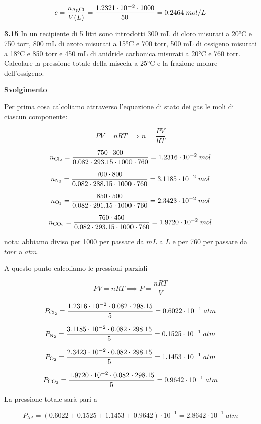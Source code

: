 $$c=\frac{n_{\rm AgCl}}{V(L)}
=\frac{1.2321 \cdot 10^{-2} \cdot 1000}{50}
=0.2464\;mol/L$$

\vspace{0.2cm}\textbf{3.15} In un recipiente di 5 litri sono introdotti 300 mL di cloro misurati a 20°C e 750 torr, 800 mL di azoto misurati a 15°C e 700 torr, 500 mL di ossigeno misurati a 18°C e 850 torr e 450 mL di anidride carbonica misurati a 20°C e 760 torr. Calcolare la pressione totale della miscela a 25°C e la frazione molare dell'ossigeno.

\vspace{0.2cm}\large\textbf{Svolgimento}\normalsize

\vspace{0.2cm}Per prima cosa calcoliamo attraverso l'equazione di stato dei gas le moli di ciascun componente:

$$PV=nRT \implies n=\frac{PV}{RT}$$

$$n_{\rm Cl_2}=\frac{750 \cdot 300}{0.082 \cdot 293.15 \cdot 1000 \cdot 760}=1.2316 \cdot 10^{-2}\;mol$$

$$n_{\rm N_2}=\frac{700 \cdot 800}{0.082 \cdot 288.15 \cdot 1000 \cdot 760}=3.1185 \cdot 10^{-2}\;mol$$

$$n_{\rm O_2}=\frac{850 \cdot 500}{0.082 \cdot 291.15 \cdot 1000 \cdot 760}=2.3423 \cdot 10^{-2}\;mol$$

$$n_{\rm CO_2}=\frac{760 \cdot 450}{0.082 \cdot 293.15 \cdot 1000 \cdot 760}=1.9720 \cdot 10^{-2}\;mol$$

nota: abbiamo diviso per 1000 per passare da $mL$ a $L$ e per 760 per passare da $torr$ a $atm$.

A questo punto calcoliamo le pressioni parziali

$$PV=nRT \implies P=\frac{nRT}{V}$$

$$P_{\rm Cl_2}=\frac{1.2316 \cdot 10^{-2} \cdot 0.082 \cdot 298.15}{5}=0.6022 \cdot 10^{-1}\;atm$$

$$P_{\rm N_2}=\frac{3.1185 \cdot 10^{-2} \cdot 0.082 \cdot 298.15}{5}=0.1525 \cdot 10^{-1}\;atm$$

$$P_{\rm O_2}=\frac{2.3423 \cdot 10^{-2} \cdot 0.082 \cdot 298.15}{5}=1.1453 \cdot 10^{-1}\;atm$$

$$P_{\rm CO_2}=\frac{1.9720 \cdot 10^{-2} \cdot 0.082 \cdot 298.15}{5}=0.9642 \cdot 10^{-1}\;atm$$

La pressione totale sarà pari a

$$P_{tot}=(0.6022 + 0.1525 + 1.1453 + 0.9642) \cdot 10^{-1}=2.8642 \cdot 10^{-1}\;atm$$

